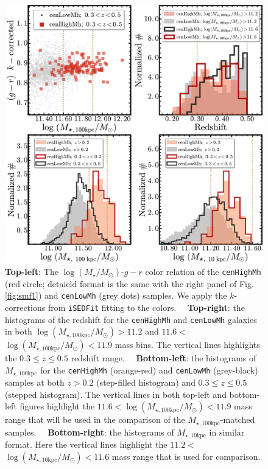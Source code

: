 \documentclass{emulateapj}
\def\rbcg{\texttt{cenHighMh}}
\def\nbcg{\texttt{cenLowMh}}
\def\logms{{$\log (M_{\star}/M_{\odot})$}}
\def\minn{{$M_{\star,10\mathrm{kpc}}$}}
\def\mtot{{$M_{\star,100\mathrm{kpc}}$}}
\def\logminn{{$\log (M_{\star,10\mathrm{kpc}}/M_{\odot})$}}
\def\logmtot{{$\log (M_{\star,100\mathrm{kpc}}/M_{\odot})$}}
\newcommand{\update}[1]{\textcolor{Bittersweet}{#1}}
\begin{document}
\begin{CJK*}{UTF8}{gbsn}
  \begin{figure}[t!]
      \centering 
      \includegraphics[width=16.5cm]{fig/redbcg_sample_stats}
      \caption{
          \update{
          \textbf{Top-left}: The \logms{}-$g-r$ color relation of the \rbcg{} 
          (red circle; detaield format is the same with the right panel of 
          Fig.\ref{fig:smf1}) and \nbcg{} (grey dots) samples.
          We apply the $k$-corrections from \texttt{iSEDFit} fitting to the colors.~~          
          \textbf{Top-right}: the histograms of the redshift for the \rbcg{} and 
          \nbcg{} galaxies in both \logmtot$>11.2$ and $11.6<$\logmtot{}$<11.9$
          mass bins.
          The vertical lines highlights the $0.3\leq z \leq 0.5$ redshift range.~~
          \textbf{Bottom-left}: the histograms of \mtot{} for the \rbcg{} (orange-red) 
          and \nbcg{} (grey-black) samples at both $z>0.2$ (step-filled histogram) and 
          $0.3 \leq z \leq 0.5$ (stepped histogram). 
          The vertical lines in both top-left and bottom-left figures highlight the 
          $11.6<$\logmtot{}$<11.9$ mass range that will be used in the comparison of 
          the \mtot{}-matched samples.~~
          \textbf{Bottom-right}: the histograms of \minn{} in similar format. 
          Here the vertical lines highlight the 
          $11.2<$\logminn{}$<11.6$ mass range that is used for comparison.}
      }
      \label{fig:sample_stats}
  \end{figure}
    


\end{CJK*}
\end{document}
